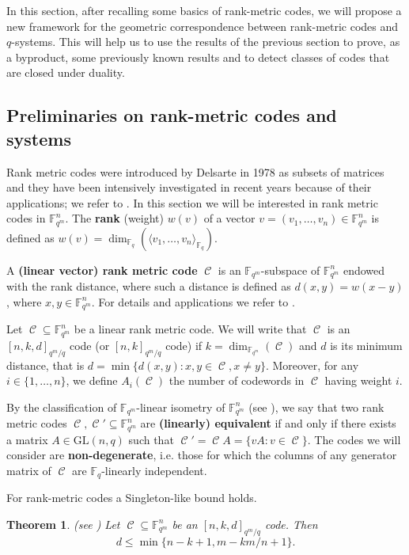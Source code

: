 \documentclass[11pt]{amsart}
\DeclareMathOperator{\C}{\mathcal{C}}
\newtheorem{theorem}{Theorem}[section]
\newcommand{\F}{{\mathbb F}}
\newcommand{\fq}{{\mathbb F}_{q}}
\begin{document}
In this section, after recalling some basics of rank-metric codes, we will propose a new framework for the geometric correspondence between rank-metric codes and $q$-systems. This will help us to use the results of the previous section to prove, as a byproduct, some previously known results and to detect classes of codes that are closed under duality.

\subsection{Preliminaries on rank-metric codes and systems}

Rank metric codes were introduced by Delsarte \cite{de78} in 1978 as subsets of matrices and they have been intensively investigated in recent years because of their applications; we refer to \cite{sheekeysurvey,polverino2020connections}.
In this section we will be interested in rank metric codes in $\F_{q^m}^n$.
The \textbf{rank} (weight) $w(v)$ of a vector $v=(v_1,\ldots,v_n) \in \F_{q^m}^n$ is defined as $w(v)=\dim_{\fq} (\langle v_1,\ldots, v_n\rangle_{\fq})$. 

A \textbf{(linear vector) rank metric code} $\C $ is an $\F_{q^m}$-subspace of $\F_{q^m}^n$ endowed with the rank distance, where such a distance is defined as $d(x,y)=w(x-y)$, where $x, y \in \F_{q^m}^n$. 
For details and applications we refer to \cite{bartz2022rank,gorla2018codes}.

Let $\C \subseteq \F_{q^m}^n$ be a linear rank metric code. We will write that $\C$ is an $[n,k,d]_{q^m/q}$ code (or $[n,k]_{q^m/q}$ code) if $k=\dim_{\F_{q^m}}(\C)$ and $d$ is its minimum distance, that is $d=\min\{d(x,y) \colon x, y \in \C, x \neq y  \}$.
Moreover, for any $i \in \{1,\ldots,n\}$, we define $A_i(\C)$ the number of codewords in $\C$ having weight $i$.

By the classification of $\F_{q^m}$-linear isometry of $\F_{q^m}^n$ (see \cite{berger2003isometries}), we say that two rank metric codes $\C,\C' \subseteq \F_{q^m}^n$ are \textbf{(linearly) equivalent} if and only if there exists a matrix $A \in \mathrm{GL}(n,q)$ such that
$\C'=\C A=\{vA : v \in \C\}$. 
The codes we will consider are \textbf{non-degenerate}, i.e. those for which the columns of any generator matrix of $\C$ are $\fq$-linearly independent. 

For rank-metric codes a Singleton-like bound holds.

\begin{theorem}(see \cite{de78}) \label{th:singletonrank}
    Let $\C \subseteq \F_{q^m}^n$ be an $[n,k,d]_{q^m/q}$ code.
Then 
\begin{equation}\label{eq:boundgen}
d \leq \min\{n-k+1,m-km/n+1\}.
\end{equation}
\end{theorem}
\end{document}
